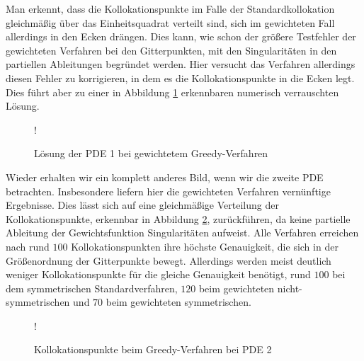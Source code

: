 Man erkennt, dass die Kollokationspunkte im Falle der Standardkollokation gleichmäßig über das Einheitsquadrat verteilt sind, sich im gewichteten Fall allerdings in den Ecken drängen. Dies kann, wie schon der größere Testfehler der gewichteten Verfahren bei den Gitterpunkten, mit den Singularitäten in den partiellen Ableitungen begründet werden. Hier versucht das Verfahren allerdings diesen Fehler zu korrigieren, in dem es die Kollokationspunkte in die Ecken legt. Dies führt aber zu einer in Abbildung \ref{fig:greedy-verrauscht} erkennbaren numerisch verrauschten Lösung. 

\begin{figure}[H]
\centering
\resizebox {\columnwidth} {!} {

}
\caption{Lösung der \acs{PDE} 1 bei gewichtetem Greedy-Verfahren}
\label{fig:greedy-verrauscht}
\end{figure}

Wieder erhalten wir ein komplett anderes Bild, wenn wir die zweite \ac{PDE} betrachten. Insbesondere liefern hier die gewichteten Verfahren vernünftige Ergebnisse. Dies lässt sich auf eine gleichmäßige Verteilung der Kollokationspunkte, erkennbar in Abbildung \ref{fig:greedy-points2}, zurückführen, da keine partielle Ableitung der Gewichtsfunktion Singularitäten aufweist. Alle Verfahren erreichen nach rund $100$ Kollokationspunkten ihre höchste Genauigkeit, die sich in der Größenordnung der Gitterpunkte bewegt. Allerdings werden meist deutlich weniger Kollokationspunkte für die gleiche Genauigkeit benötigt, rund $100$ bei dem symmetrischen Standardverfahren, $120$ beim gewichteten nicht-symmetrischen und $70$ beim gewichteten symmetrischen.
\begin{figure}[ht]
\centering
\resizebox {\columnwidth} {!} {

}
\caption{Kollokationspunkte beim Greedy-Verfahren bei \acs{PDE} 2}
\label{fig:greedy-points2}
\end{figure}

